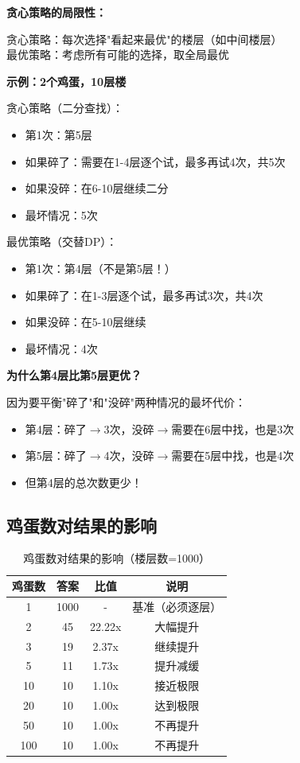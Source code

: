 \documentclass[12pt,a4paper]{article}
\begin{document}
\textbf{贪心策略的局限性：}

贪心策略：每次选择"看起来最优"的楼层（如中间楼层）\\
最优策略：考虑所有可能的选择，取全局最优

\textbf{示例：2个鸡蛋，10层楼}

贪心策略（二分查找）：
\begin{itemize}
    \item 第1次：第5层
    \item 如果碎了：需要在1-4层逐个试，最多再试4次，共5次
    \item 如果没碎：在6-10层继续二分
    \item 最坏情况：5次
\end{itemize}

最优策略（交替DP）：
\begin{itemize}
    \item 第1次：第4层（不是第5层！）
    \item 如果碎了：在1-3层逐个试，最多再试3次，共4次
    \item 如果没碎：在5-10层继续
    \item 最坏情况：4次
\end{itemize}

\textbf{为什么第4层比第5层更优？}

因为要平衡"碎了"和"没碎"两种情况的最坏代价：
\begin{itemize}
    \item 第4层：碎了$\to$3次，没碎$\to$需要在6层中找，也是3次
    \item 第5层：碎了$\to$4次，没碎$\to$需要在5层中找，也是4次
    \item 但第4层的总次数更少！
\end{itemize}

\subsection{鸡蛋数对结果的影响}

\begin{table}[H]
\centering
\caption{鸡蛋数对结果的影响（楼层数=1000）}
\label{tab:eggs_impact}
\begin{tabular}{@{}cccc@{}}
\toprule
\textbf{鸡蛋数} & \textbf{答案} & \textbf{比值} & \textbf{说明} \\
\midrule
1 & 1000 & - & 基准（必须逐层） \\
2 & 45 & 22.22x & 大幅提升 \\
3 & 19 & 2.37x & 继续提升 \\
5 & 11 & 1.73x & 提升减缓 \\
10 & 10 & 1.10x & 接近极限 \\
20 & 10 & 1.00x & 达到极限 \\
50 & 10 & 1.00x & 不再提升 \\
100 & 10 & 1.00x & 不再提升 \\
\bottomrule
\end{tabular}
\end{table}
\end{document}
